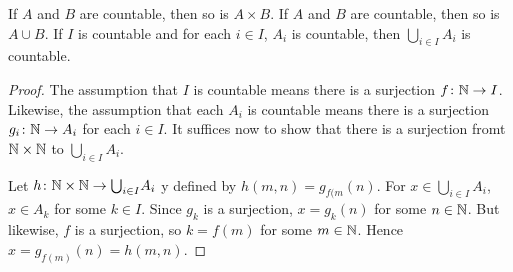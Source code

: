 \begin{lemma}
	If $A$ and $B$ are countable, then so is $A\times B$.
	If $A$ and $B$ are countable, then so is $A\cup B$.
	If $I$ is countable and for each $i\in I$, $A_i$ is countable, then $\bigcup_{i\in I}A_i$ is countable.
	
	\begin{proof}
		The assumption that $I$ is countable means there is a surjection ${f}\colon{\mathbb N}\to{I}$. Likewise, the assumption that each $A_i$ is countable means there is a surjection ${g_i}\colon{\mathbb N}\to{A_i}$ for each $i\in I$. It suffices now to show that there is a surjection fromt $\mathbb N\times \mathbb N$ to $\bigcup_{i\in I}A_i$.
		
		Let ${h}\colon{\mathbb N\times \mathbb N}\to{\bigcup}_{i\in I}A_i$ y defined by $h(m,n) = g_{f(m}(n)$. For $x\in \bigcup_{i\in I}A_i$, $x\in  A_k$ for some $k\in I$. Since $g_k$ is a surjection, $x = g_k(n)$ for some $n\in\mathbb N$. 
		But likewise, $f$ is a surjection, so $k = f(m)$ for some $m\in\mathbb N$. 
		Hence $x = g_{f(m)}(n) = h(m,n)$.
	\end{proof}
\end{lemma}

%


